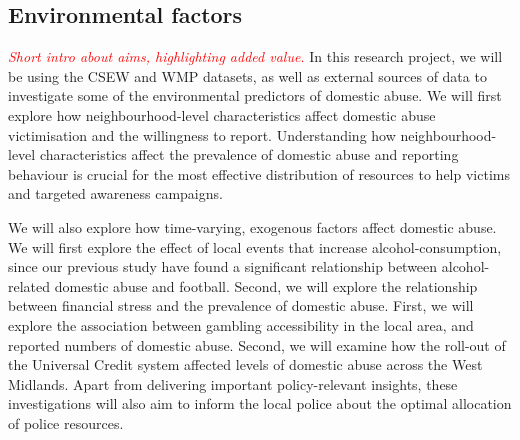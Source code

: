 \documentclass[11pt, a4paper]{article}
\begin{document}
\subsection*{Environmental factors}

\textcolor{red}{\textit{Short intro about aims, highlighting added value.}}
In this research project, we will be using the CSEW and WMP datasets, as well as external sources of data to investigate some of the environmental predictors of domestic abuse. We will first explore how neighbourhood-level characteristics affect domestic abuse victimisation and the willingness to report. Understanding how neighbourhood-level characteristics affect the prevalence of domestic abuse and reporting behaviour is crucial for the most effective distribution of resources to help victims and targeted awareness campaigns. 

We will also explore how time-varying, exogenous factors affect domestic abuse. We will first explore the effect of local events that increase alcohol-consumption, since our previous study have found a significant relationship between alcohol-related domestic abuse and football. Second, we will explore the relationship between financial stress and the prevalence of domestic abuse. First, we will explore the association between gambling accessibility in the local area, and reported numbers of domestic abuse. Second, we will examine how the roll-out of the Universal Credit system affected levels of domestic abuse across the West Midlands. Apart from delivering important policy-relevant insights, these investigations will also aim to inform the local police about the optimal allocation of police resources. 
\end{document}
